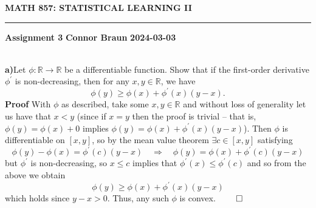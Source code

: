\documentclass[10pt]{article}
\newcommand{\mbb}[1]{\mathbb{#1}}
\newcommand{\1}[1]{\mathbbm{1}_{#1}}
\begin{document}
    \begin{center}
        {\bf\large{MATH 857: STATISTICAL LEARNING II}}
        \smallskip
        \hrule
        \smallskip
        {\bf Assignment 3} \hfill {\bf Connor Braun} \hfill {\bf 2024-03-03}
    \end{center}
    \\[5pt]
    {\bf a)}\hspace{5pt}Let $\phi:\mathbb{R}\rightarrow\mbb{R}$ be a differentiable function. Show that if the first-order
    derivative $\phi^\prime$ is non-decreasing, then for any $x,y\in\mbb{R}$, we have
    \[\phi(y)\geq \phi(x)+\phi^\prime(x)(y-x).\]
    {\bf Proof}\hspace{5pt} With $\phi$ as described, take some $x,y\in\mathbb{R}$ and without loss of generality let us have that $x<y$ (since if $x=y$ then the proof is trivial -- that is, $\phi(y)=\phi(x)+0$ implies $\phi(y)=\phi(x)+\phi^\prime(x)(y-x)$). 
    Then $\phi$ is differentiable on $[x,y]$, so by the mean value theorem $\exists c\in[x,y]$ satisfying
    \[\phi(y)-\phi(x)=\phi^\prime(c)(y-x)\quad\Rightarrow\quad \phi(y)=\phi(x)+\phi^\prime(c)(y-x)\]
    but $\phi^\prime$ is non-decreasing, so $x\leq c$ implies that $\phi^\prime(x)\leq \phi^\prime(c)$ and so from the above we obtain
    \[\phi(y)\geq \phi(x)+\phi^\prime(x)(y-x)\]
    which holds since $y-x>0$. Thus, any such $\phi$ is convex. \hfill{$\qed$}\\[5pt]
\end{document}
